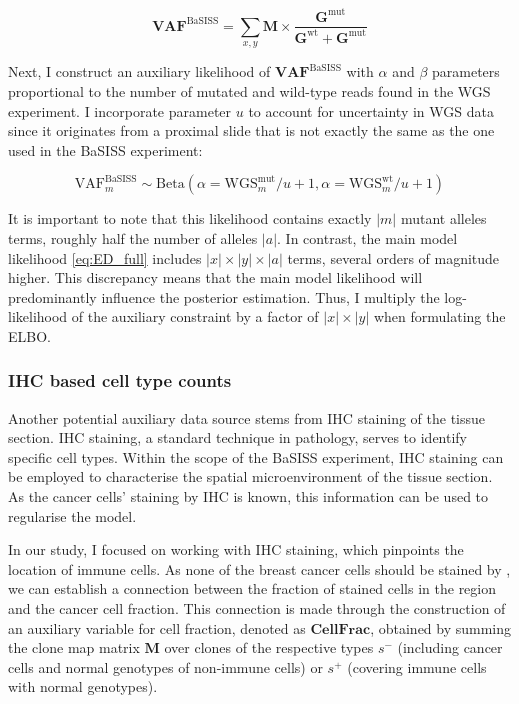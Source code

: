 \begin{equation} 
\mathbf{VAF}^{\text{BaSISS}} = \sum_{x,y} \mathbf{M} \times \dfrac{\mathbf{G}^{\text{mut}}}{\mathbf{G}^{\text{wt}} + \mathbf{G}^{\text{mut}}}
\end{equation}

Next, I construct an auxiliary likelihood of $\mathbf{VAF}^{\text{BaSISS}}$ with $\alpha$ and $\beta$ parameters proportional to the number of mutated and wild-type reads found in the \ac{WGS} experiment. I incorporate parameter $u$ to account for uncertainty in \ac{WGS} data since it originates from a proximal slide that is not exactly the same as the one used in the BaSISS experiment:

\begin{equation} 
    \text{VAF}^{\text{BaSISS}}_m \sim \mathrm{Beta}(\alpha=\text{WGS}^\text{mut}_m / u + 1, \alpha=\text{WGS}^\text{wt}_m / u + 1)
\end{equation}

It is important to note that this likelihood contains exactly $|m|$ mutant alleles terms, roughly half the number of alleles $|a|$. In contrast, the main model likelihood \cref{eq:ED_full} includes $|x| \times |y| \times |a|$ terms, several orders of magnitude higher. This discrepancy means that the main model likelihood will predominantly influence the posterior estimation. Thus, I multiply the log-likelihood of the auxiliary constraint by a factor of $|x| \times |y|$ when formulating the \ac{ELBO}.

\subsubsection*{\acl{IHC} based cell type counts}

Another potential auxiliary data source stems from \ac{IHC} staining of the tissue section. \ac{IHC} staining, a standard technique in pathology, serves to identify specific cell types. Within the scope of the \ac{BaSISS} experiment, \ac{IHC} staining can be employed to characterise the spatial microenvironment of the tissue section. As the cancer cells' staining by \ac{IHC} is known, this information can be used to regularise the model.

In our study, I focused on working with  \ac{IHC} staining, which pinpoints the location of immune cells. As none of the breast cancer cells should be stained by , we can establish a connection between the fraction of stained cells in the region and the cancer cell fraction. This connection is made through the construction of an auxiliary variable for cell fraction, denoted as $\mathbf{CellFrac}$, obtained by summing the clone map matrix $\mathbf{M}$ over clones of the respective types $s^-$ (including cancer cells and normal genotypes of non-immune cells) or $s^+$ (covering immune cells with normal genotypes).

